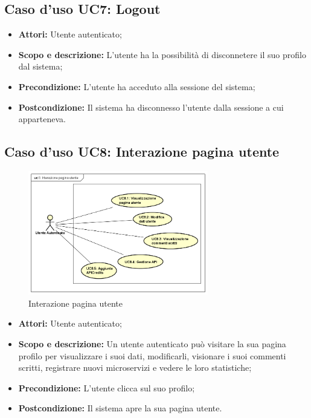 \documentclass[12pt,a4paper,titlepage]{article}
\begin{document}
\subsection{Caso d'uso UC7: Logout}
\begin{itemize}
	\item \textbf{Attori: }Utente autenticato;
	\item \textbf{Scopo e descrizione: }L'utente ha la possibilità di disconnetere il suo profilo dal sistema;
	\item \textbf{Precondizione: }L'utente ha acceduto alla sessione del sistema;
	\item \textbf{Postcondizione: }Il sistema ha disconnesso l'utente dalla sessione a cui apparteneva.
\end{itemize}
\subsection{Caso d'uso UC8: Interazione pagina utente}
\begin{figure}[H]
	\centering
	\includegraphics[width=0.7\textwidth]{UseCase/InterazionePaginaUtente}
	\caption{Interazione pagina utente}
\end{figure}
\begin{itemize}
	\item \textbf{Attori: }Utente autenticato;
	\item \textbf{Scopo e descrizione: }Un utente autenticato può visitare la sua pagina profilo per visualizzare i suoi dati, modificarli, visionare i suoi commenti scritti, registrare nuovi microservizi e vedere le loro statistiche;
	\item \textbf{Precondizione: }L'utente clicca sul suo profilo;
	\item \textbf{Postcondizione: }Il sistema apre la sua pagina utente.
\end{itemize}
\end{document}
